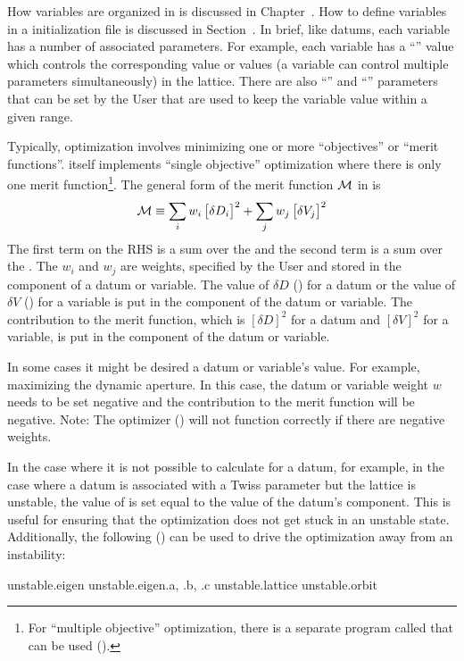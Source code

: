 How variables are organized in \tao is discussed in Chapter~. How to define variables in
a \tao initialization file is discussed in Section~. In brief, like datums, each
variable has a number of associated parameters. For example, each variable has a ``''
value which controls the corresponding value or values (a variable can control multiple parameters
simultaneously) in the  lattice. There are also ``'' and ``''
parameters that can be set by the User that are used to keep the variable  value within a
given range.

Typically, optimization involves minimizing one or more ``objectives'' or ``merit functions''. \tao
itself implements ``single objective'' optimization where there is only one merit
function\footnote{For ``multiple objective'' optimization, there is a separate program called
 that can be used ().}. The general form of the merit function $\cal M$ in \tao
is
\begin{equation}
  {\cal M} \equiv 
    \sum_{i} w_i \, \bigl[ \delta D_i \bigr]^2 + 
    \sum_{j} w_j \, \bigl[ \delta V_j \bigr]^2
  \label{m1}
\end{equation}
The first term on the RHS is a sum over the  and the second term is a sum over the
.  The $w_i$ and $w_j$ are weights, specified by the User and stored in the
 component of a datum or variable. The value of $\delta D$ () for a datum or
the value of $\delta V$ () for a variable is put in the  component of
the datum or variable. The contribution to the merit function, which is $[\delta D]^2$ for a datum
and $[\delta V]^2$ for a variable, is put in the  component of the datum or variable.

In some cases it might be desired a datum or variable's value. For example, maximizing the dynamic
aperture. In this case, the datum or variable weight $w$ needs to be set negative and the
contribution to the merit function will be negative. Note: The  optimizer
() will not function correctly if there are negative weights.

In the case where it is not possible to calculate  for a datum, for example, in the
case where a datum is associated with a Twiss parameter but the lattice is unstable, the value of
 is set equal to the value of the datum's  component. This is
useful for ensuring that the optimization does not get stuck in an unstable state. Additionally, the
following  () can be used to drive the optimization away from an
instability:
\begin{example}
  unstable.eigen
  unstable.eigen.a, .b, .c
  unstable.lattice
  unstable.orbit
\end{example}

